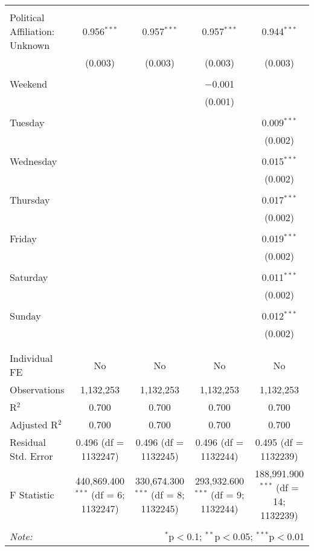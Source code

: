 \documentclass[
]{article}
\begin{document}
\begin{table}[!htbp]
{\begin{tabular}{@{\extracolsep{5pt}}lcccc}
  & & & & \\ 
 Political Affiliation: Unknown & 0.956$^{***}$ & 0.957$^{***}$ & 0.957$^{***}$ & 0.944$^{***}$ \\ 
  & (0.003) & (0.003) & (0.003) & (0.003) \\ 
  & & & & \\ 
 Weekend &  &  & $-$0.001 &  \\ 
  &  &  & (0.001) &  \\ 
  & & & & \\ 
 Tuesday &  &  &  & 0.009$^{***}$ \\ 
  &  &  &  & (0.002) \\ 
  & & & & \\ 
 Wednesday &  &  &  & 0.015$^{***}$ \\ 
  &  &  &  & (0.002) \\ 
  & & & & \\ 
 Thursday &  &  &  & 0.017$^{***}$ \\ 
  &  &  &  & (0.002) \\ 
  & & & & \\ 
 Friday &  &  &  & 0.019$^{***}$ \\ 
  &  &  &  & (0.002) \\ 
  & & & & \\ 
 Saturday &  &  &  & 0.011$^{***}$ \\ 
  &  &  &  & (0.002) \\ 
  & & & & \\ 
 Sunday &  &  &  & 0.012$^{***}$ \\ 
  &  &  &  & (0.002) \\ 
  & & & & \\ 
\hline \\[-1.8ex] 
Individual FE & No & No & No & No \\ 
Observations & 1,132,253 & 1,132,253 & 1,132,253 & 1,132,253 \\ 
R$^{2}$ & 0.700 & 0.700 & 0.700 & 0.700 \\ 
Adjusted R$^{2}$ & 0.700 & 0.700 & 0.700 & 0.700 \\ 
Residual Std. Error & 0.496 (df = 1132247) & 0.496 (df = 1132245) & 0.496 (df = 1132244) & 0.495 (df = 1132239) \\ 
F Statistic & 440,869.400$^{***}$ (df = 6; 1132247) & 330,674.300$^{***}$ (df = 8; 1132245) & 293,932.600$^{***}$ (df = 9; 1132244) & 188,991.900$^{***}$ (df = 14; 1132239) \\ 
\hline 
\hline \\[-1.8ex] 
\textit{Note:}  & \multicolumn{4}{r}{$^{*}$p$<$0.1; $^{**}$p$<$0.05; $^{***}$p$<$0.01} \\ 
\end{tabular}
} 
\end{table} 
\newpage
\end{document}
